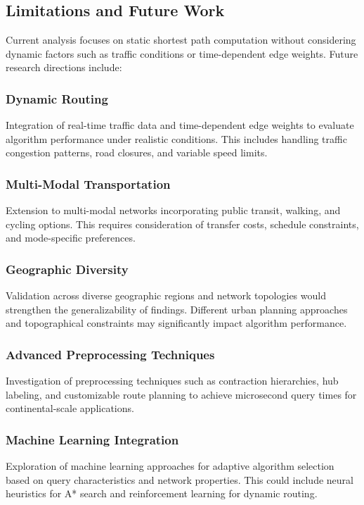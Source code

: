 \documentclass[conference]{IEEEtran}
\begin{document}
\subsection{Limitations and Future Work}

Current analysis focuses on static shortest path computation without considering dynamic factors such as traffic conditions or time-dependent edge weights. Future research directions include:

\subsubsection{Dynamic Routing}
Integration of real-time traffic data and time-dependent edge weights to evaluate algorithm performance under realistic conditions. This includes handling traffic congestion patterns, road closures, and variable speed limits.

\subsubsection{Multi-Modal Transportation}
Extension to multi-modal networks incorporating public transit, walking, and cycling options. This requires consideration of transfer costs, schedule constraints, and mode-specific preferences.

\subsubsection{Geographic Diversity}
Validation across diverse geographic regions and network topologies would strengthen the generalizability of findings. Different urban planning approaches and topographical constraints may significantly impact algorithm performance.

\subsubsection{Advanced Preprocessing Techniques}
Investigation of preprocessing techniques such as contraction hierarchies, hub labeling, and customizable route planning to achieve microsecond query times for continental-scale applications.

\subsubsection{Machine Learning Integration}
Exploration of machine learning approaches for adaptive algorithm selection based on query characteristics and network properties. This could include neural heuristics for A* search and reinforcement learning for dynamic routing.
\end{document}
